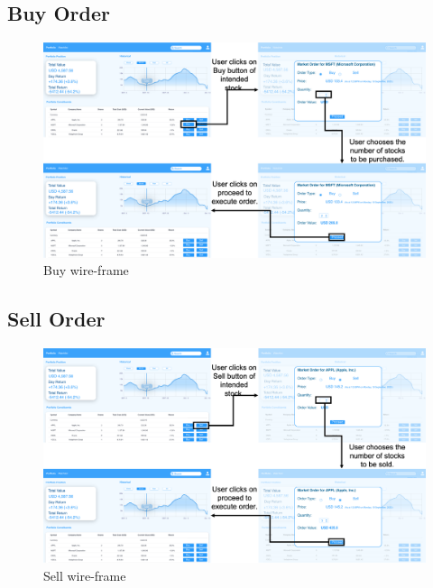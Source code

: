 \subsection{Buy Order}
\begin{figure}[h]
    \centering
    \includegraphics[scale = 0.5]{./3_story_boards/Buy.png}
    \caption{Buy wire-frame}
    \label{fig:buy}
\end{figure}
\break

\subsection{Sell Order}
\begin{figure}[h]
    \centering
    \includegraphics[scale = 0.5]{./3_story_boards/Sell.png}
    \caption{Sell wire-frame}
    \label{fig:sell}
\end{figure}
\break



